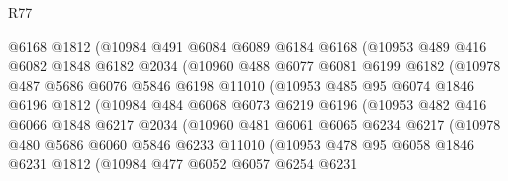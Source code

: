 \begin{lexlean}{R77}
\begin{coremodule}
                  @6168
                  @1812
                  (@10984
                    @491
                    @6084
                    @6089
                    @6184
                    @6168
                    (@10953
                      @489
                      @416
                      @6082
                      @1848
                      @6182
                      @2034
                      (@10960
                        @488
                        @6077
                        @6081
                        @6199
                        @6182
                        (@10978
                          @487
                          @5686
                          @6076
                          @5846
                          @6198
                          @11010
                          (@10953
                            @485
                            @95
                            @6074
                            @1846
                            @6196
                            @1812
                            (@10984
                              @484
                              @6068
                              @6073
                              @6219
                              @6196
                              (@10953
                                @482
                                @416
                                @6066
                                @1848
                                @6217
                                @2034
                                (@10960
                                  @481
                                  @6061
                                  @6065
                                  @6234
                                  @6217
                                  (@10978
                                    @480
                                    @5686
                                    @6060
                                    @5846
                                    @6233
                                    @11010
                                    (@10953
                                      @478
                                      @95
                                      @6058
                                      @1846
                                      @6231
                                      @1812
                                      (@10984
                                        @477
                                        @6052
                                        @6057
                                        @6254
                                        @6231

\end{coremodule}
\end{lexlean}

